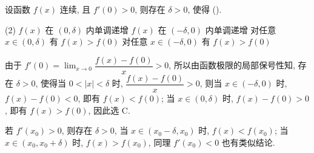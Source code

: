 \begin{example}[2004 数一]
    设函数 $f(x)$ 连续, 且 $f'(0)>0$, 则存在 $\delta>0$, 使得 (\quad).
    \begin{tasks}(2)
        \task $f(x)$ 在 $(0,\delta)$ 内单调递增
        \task $f(x)$ 在 $(-\delta,0)$ 内单调递增
        \task 对任意 $x\in(0,\delta)$ 有 $f(x)>f(0)$
        \task 对任意 $x\in(-\delta,0)$ 有 $f(x)>f(0)$
    \end{tasks}
\end{example}
\begin{solution}
    由于 $f'(0)=\displaystyle\lim_{x\to0}\dfrac{f(x)-f(0)}{x}>0$, 所以由函数极限的局部保号性知, 存在 $\delta>0$, 使得当 $0<|x|<\delta$ 时, $\dfrac{f(x)-f(0)}{x}>0$,
    则当 $x\in(-\delta,0)$ 时, $f(x)-f(0)<0$, 即有 $f(x)<f(0)$; 当 $x\in(0,\delta)$ 时, $f(x)-f(0)>0$, 即有 $f(x)>f(0)$, 因此选 C.
\end{solution}
\begin{inference}
    若 $f'(x_0)>0$, 则存在 $\delta>0$, 当 $x\in(x_0-\delta,x_0)$ 时, $f(x)<f(x_0)$; 当 $x\in(x_0,x_0+\delta)$ 时, $f(x)>f(x_0)$, 同理 $f'(x_0)<0$ 也有类似结论.
\end{inference}


